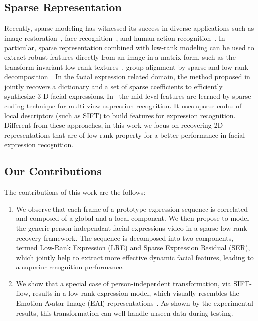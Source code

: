 \documentclass[journal]{IEEEtran}
\begin{document}
\subsection{Sparse Representation}

Recently, sparse modeling has witnessed its success in diverse applications such as image restoration~\cite{Yang_CVPR08}, face recognition~\cite{Wright_PAMI09}, and human action recognition~\cite{Qiu_ICCV11}. In particular, sparse representation combined with low-rank modeling can be used to extract robust features directly from an image in a matrix form, such as the transform invariant low-rank textures~\cite{Zhang_IJCV12}, group alignment by sparse and low-rank decomposition~\cite{Peng_PAMI12}. In the facial expression related domain, the method proposed in~\cite{Lin12} jointly recovers a dictionary and a set of sparse coefficients to efficiently synthesize 3-D facial expressions. In~\cite{Tariq12} the mid-level features are learned by sparse coding technique for multi-view expression recognition. It uses sparse codes of local descriptors (such as SIFT) to build features for expression recognition. Different from these approaches, in this work we focus on recovering 2D representations that are of low-rank property for a better performance in facial expression recognition. 

\subsection{Our Contributions}
The contributions of this work are the follows:
\begin{enumerate}
\item We observe that each frame of a prototype expression sequence is correlated and composed of a global and a local component. We then propose to model the generic person-independent facial expressions video in a sparse low-rank recovery framework. The sequence is decomposed into two components, termed Low-Rank Expression (LRE) and Sparse Expression Residual (SER), which jointly help to extract more effective dynamic facial features, leading to a superior recognition performance. 
\item We show that a special case of person-independent transformation, via SIFT-flow, results in a low-rank expression model, which visually resembles the Emotion Avatar Image (EAI) representations~\cite{Yang_SMCB12}. As shown by the experimental results, this transformation can well handle unseen data during testing.
\end{enumerate}
\end{document}
